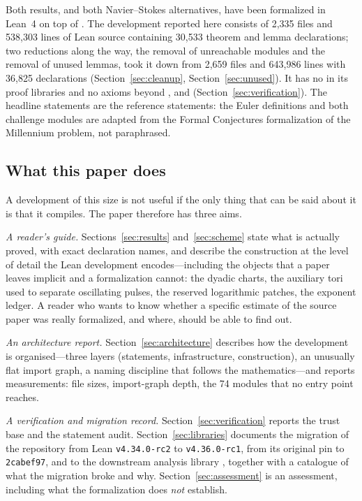 Both results, and both Navier--Stokes alternatives, have been formalized in Lean~4
\cite{lean} on top of \Mathlib{} \cite{mathlib}. The development reported here consists of
2{,}335 files and 538{,}303 lines of Lean source containing 30{,}533 theorem and lemma
declarations; two reductions along the way, the removal of unreachable modules and the
removal of unused lemmas, took it down from 2{,}659 files and 643{,}986 lines with 36{,}825
declarations (Section~\ref{sec:cleanup}, Section~\ref{sec:unused}). It has no  in its proof libraries and no axioms beyond
,  and  (Section~\ref{sec:verification}).
The headline statements are the reference statements: the Euler definitions and both
challenge modules are adapted from the Formal Conjectures formalization
\cite{formalconj} of the Millennium problem, not paraphrased.

\subsection{What this paper does}

A development of this size is not useful if the only thing that can be said about it is
that it compiles. The paper therefore has three aims.

\emph{A reader's guide.} Sections~\ref{sec:results} and~\ref{sec:scheme} state what is
actually proved, with exact declaration names, and describe the construction at the level
of detail the Lean development encodes---including the objects that a paper leaves implicit
and a formalization cannot: the dyadic charts, the auxiliary tori used to separate
oscillating pulses, the reserved logarithmic patches, the exponent ledger. A reader who
wants to know whether a specific estimate of the source paper was really formalized, and
where, should be able to find out.

\emph{An architecture report.} Section~\ref{sec:architecture} describes how the development
is organised---three layers (statements, infrastructure, construction), an unusually flat
import graph, a naming discipline that follows the mathematics---and reports measurements:
file sizes, import-graph depth, the 74 modules that no entry point reaches.

\emph{A verification and migration record.} Section~\ref{sec:verification} reports the trust
base and the statement audit. Section~\ref{sec:libraries} documents the migration of the
repository from Lean \texttt{v4.34.0-rc2} to \texttt{v4.36.0-rc1}, from its original
\Mathlib{} pin to \Mathlib{} \texttt{2cabef97}, and to the downstream analysis library
\TauCeti{} \cite{tauceti}, together with a catalogue of what the migration broke and why.
Section~\ref{sec:assessment} is an assessment, including what the formalization does
\emph{not} establish.

